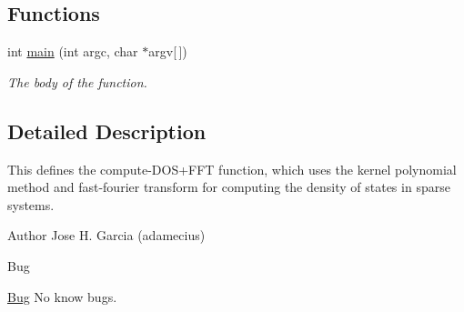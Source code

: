 \subsection*{Functions}
\begin{DoxyCompactItemize}
\item 
int \hyperlink{compute-DOS_09FFT_8cpp_a0ddf1224851353fc92bfbff6f499fa97}{main} (int argc, char $\ast$argv\mbox{[}$\,$\mbox{]})\hypertarget{compute-DOS_09FFT_8cpp_a0ddf1224851353fc92bfbff6f499fa97}{}\label{compute-DOS_09FFT_8cpp_a0ddf1224851353fc92bfbff6f499fa97}

\begin{DoxyCompactList}\small\item\em The body of the function. \end{DoxyCompactList}\end{DoxyCompactItemize}


\subsection{Detailed Description}
This defines the compute-\/\+D\+O\+S+\+F\+FT function, which uses the kernel polynomial method and fast-\/fourier transform for computing the density of states in sparse systems. 

\begin{DoxyAuthor}{Author}
Jose H. Garcia (adamecius) 
\end{DoxyAuthor}
\begin{DoxyRefDesc}{Bug}
\item[\hyperlink{bug__bug000001}{Bug}]No know bugs. \end{DoxyRefDesc}
